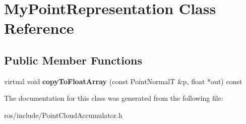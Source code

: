 \hypertarget{class_my_point_representation}{\section{\-My\-Point\-Representation \-Class \-Reference}
\label{class_my_point_representation}
}
\subsection*{\-Public \-Member \-Functions}
\begin{DoxyCompactItemize}
\item 
\hypertarget{class_my_point_representation_adaf372e3a1093398b90a3216494e8a1d}{virtual void {\bfseries copy\-To\-Float\-Array} (const \-Point\-Normal\-T \&p, float $\ast$out) const }\label{class_my_point_representation_adaf372e3a1093398b90a3216494e8a1d}

\end{DoxyCompactItemize}


\-The documentation for this class was generated from the following file\-:\begin{DoxyCompactItemize}
\item 
ros/include/\-Point\-Cloud\-Accumulator.\-h\end{DoxyCompactItemize}
